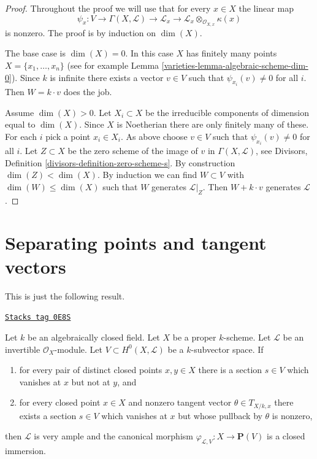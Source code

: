 \begin{proof}

Throughout the proof we will use that for every $x \in X$
the linear map
$$
\psi_x : V \to \Gamma(X, \mathcal{L}) \to \mathcal{L}_x \to
\mathcal{L}_x \otimes_{\mathcal{O}_{X, x}} \kappa(x)
$$
is nonzero. The proof is by induction on $\dim(X)$.

\medskip\noindent
The base case is $\dim(X) = 0$. In this case $X$ has finitely many points
$X = \{x_1, \ldots, x_n\}$ (see for example
Lemma \ref{varieties-lemma-algebraic-scheme-dim-0}). Since $k$ is infinite
there exists a vector $v \in V$ such that $\psi_{x_i}(v) \not = 0$
for all $i$. Then $W = k\cdot v$ does the job.

\medskip\noindent
Assume $\dim(X) > 0$. Let $X_i \subset X$ be the irreducible components
of dimension equal to $\dim(X)$. Since $X$ is Noetherian there are only
finitely many of these. For each $i$ pick a point $x_i \in X_i$.
As above choose $v \in V$ such that $\psi_{x_i}(v) \not = 0$
for all $i$. Let $Z \subset X$ be the zero scheme of the image
of $v$ in $\Gamma(X, \mathcal{L})$, see
Divisors, Definition \ref{divisors-definition-zero-scheme-s}.
By construction $\dim(Z) < \dim(X)$. By induction we can find
$W \subset V$ with $\dim(W) \leq \dim(X)$ such that $W$ generates
$\mathcal{L}|_Z$. Then $W + k\cdot v$ generates $\mathcal{L}$.
\end{proof}

\section{Separating points and tangent vectors}
\label{varieties-section-separating-points-tangent-vectors}
This is just the following result.

\begin{lemma}
\label{varieties-lemma-separate-points-tangent-vectors}
\href{https://stacks.math.columbia.edu/tag/0E8S}{\texttt{Stacks tag 0E8S}}

Let $k$ be an algebraically closed field.
Let $X$ be a proper $k$-scheme.
Let $\mathcal{L}$ be an invertible $\mathcal{O}_X$-module.
Let $V \subset H^0(X, \mathcal{L})$ be a $k$-subvector space. If
\begin{enumerate}
\item for every pair of distinct closed points $x, y \in X$
there is a section $s \in V$ which vanishes at $x$ but not at $y$, and
\item for every closed point $x \in X$ and nonzero tangent vector
$\theta \in T_{X/k, x}$ there exists a section $s \in V$
which vanishes at $x$ but whose pullback by $\theta$ is nonzero,
\end{enumerate}
then $\mathcal{L}$ is very ample and the canonical morphism
$\varphi_{\mathcal{L}, V} : X \to \mathbf{P}(V)$
is a closed immersion.
\end{lemma}

